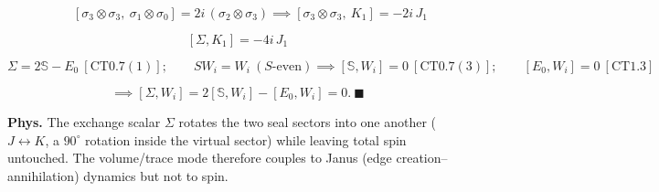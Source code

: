 \begin{theorem}
\[
\qquad [\sigma_3\otimes\sigma_3,\ \sigma_1\otimes\sigma_0]=2i\,(\sigma_2\otimes\sigma_3)\implies[\sigma_3\otimes\sigma_3,\ K_1]=-2i\,J_1
\]

\[
[\Sigma,K_1]=-4i\,J_1
\]

\[
\Sigma=2\mathbb S-E_0\ [\mathrm{CT0.7}(1)];\qquad
SW_i=W_i\ (S\text{-even})\implies[\mathbb S,W_i]=0\ [\mathrm{CT0.7}(3)];\qquad
[E_0,W_i]=0\ [\mathrm{CT1.3}]
\]

\[
\implies[\Sigma,W_i]=2[\mathbb S,W_i]-[E_0,W_i]=0.\ \blacksquare
\]

\textbf{Phys.} The exchange scalar $\Sigma$ rotates the two seal sectors into one another ($J\leftrightarrow K$, a $90^\circ$ rotation inside the virtual sector) while leaving total spin untouched. The volume/trace mode therefore couples to Janus (edge creation–annihilation) dynamics but not to spin.

\end{theorem}

